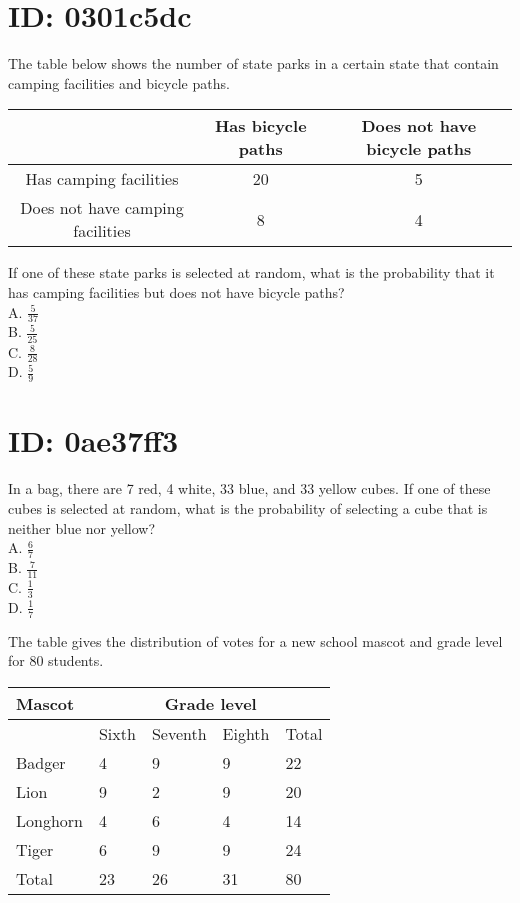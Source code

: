 


\section*{ID: 0301c5dc}
The table below shows the number of state parks in a certain state that contain camping facilities and bicycle paths.

\begin{center}
\begin{tabular}{|c|c|c|}
\hline
 & Has bicycle paths & Does not have bicycle paths \\
\hline
Has camping facilities & 20 & 5 \\
\hline
Does not have camping facilities & 8 & 4 \\
\hline
\end{tabular}
\end{center}

If one of these state parks is selected at random, what is the probability that it has camping facilities but does not have bicycle paths?\\
A. $\frac{5}{37}$\\
B. $\frac{5}{25}$\\
C. $\frac{8}{28}$\\
D. $\frac{5}{9}$

\section*{ID: 0ae37ff3}
In a bag, there are 7 red, 4 white, 33 blue, and 33 yellow cubes. If one of these cubes is selected at random, what is the probability of selecting a cube that is neither blue nor yellow?\\
A. $\frac{6}{7}$\\
B. $\frac{7}{11}$\\
C. $\frac{1}{3}$\\
D. $\frac{1}{7}$

The table gives the distribution of votes for a new school mascot and grade level for 80 students.

\begin{center}
\begin{tabular}{|l|l|l|l|l|}
\hline
\multirow[b]{2}{*}{Mascot} & \multicolumn{4}{|c|}{Grade level} \\
\hline
 & Sixth & Seventh & Eighth & Total \\
\hline
Badger & 4 & 9 & 9 & 22 \\
\hline
Lion & 9 & 2 & 9 & 20 \\
\hline
Longhorn & 4 & 6 & 4 & 14 \\
\hline
Tiger & 6 & 9 & 9 & 24 \\
\hline
Total & 23 & 26 & 31 & 80 \\
\hline
\end{tabular}
\end{center}

